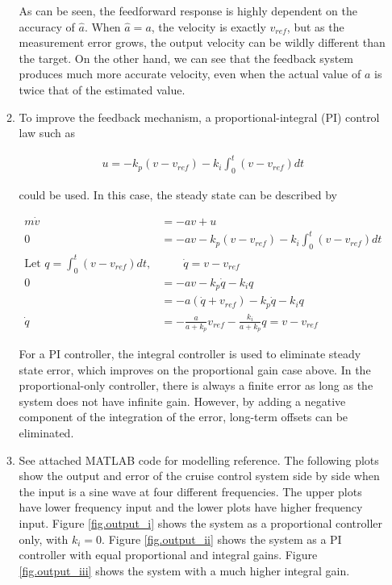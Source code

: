 \documentclass[11pt]{article}
\theoremstyle{definition}
\begin{document}
\begin{enumerate}
\begin{enumerate}
        As can be seen, the feedforward response is highly dependent on the accuracy of $\hat{a}$.  When $\hat{a} = a$, the velocity is exactly $v_{ref}$, but as the measurement error grows, the output velocity can be wildly different than the target.  On the other hand, we can see that the feedback system produces much more accurate velocity, even when the actual value of $a$ is twice that of the estimated value.
        
        \item %
        To improve the feedback mechanism, a proportional-integral (PI) control law such as 

        \begin{align*}
            u = -k_p (v - v_{ref}) - k_i \int_0^t (v - v_{ref})dt
        \end{align*}

         could be used.  In this case, the steady state can be described by

        \begin{align*}
            m\dot{v} &= -av + u\\
            0 &= -av  - k_p (v - v_{ref}) - k_i \int_0^t (v - v_{ref})dt \\
            \text{Let } q=  \int_0^t (v - v_{ref})dt, &\qquad \dot{q} = v - v_{ref} \\
            0 &= -av -k_p \dot{q} - k_i q \\
            &= - a \left(\dot{q}+ v_{ref} \right) - k_p \dot{q} - k_i q \\
            \dot{q} &= -\frac{a}{a + k_p} v_{ref} - \frac{k_i}{a + k_p} q = v - v_{ref}
         \end{align*}

         For a PI controller, the integral controller is used to eliminate steady state error, which improves on the proportional gain case above.  In the proportional-only controller, there is always a finite error as long as the system does not have infinite gain.  However, by adding a negative component of the integration of the error, long-term offsets can be eliminated.

        \item %
        See attached MATLAB code for modelling reference.  The following plots show the output and error of the cruise control system side by side when the input is a sine wave at four different frequencies.  The upper plots have lower frequency input and the lower plots have higher frequency input.  Figure \ref{fig.output_i} shows the system as a proportional controller only, with $k_i = 0$.  Figure \ref{fig.output_ii} shows the system as a PI controller with equal proportional and integral gains.  Figure \ref{fig.output_iii} shows the system with a much higher integral gain.


\end{enumerate}
\end{enumerate}
\end{document}

